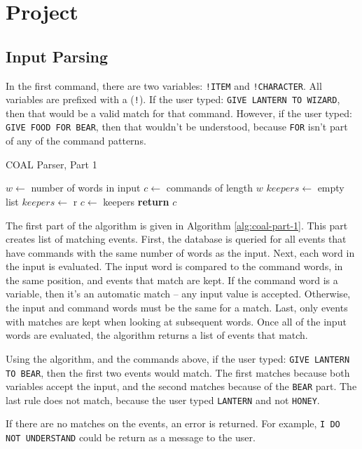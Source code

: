 \documentclass{article}
\newcommand{\enterProblemHeader}[1]{
}
\newcommand{\exitProblemHeader}[1]{
\nobreak\extramarks{#1}{}\nobreak
}
\newcounter{homeworkProblemCounter} %
\newcommand{\homeworkProblemName}{}
\newenvironment{homeworkProblem}[1][Problem \arabic{homeworkProblemCounter}]{ %
\stepcounter{homeworkProblemCounter} %
\renewcommand{\homeworkProblemName}{#1} %
\section{\homeworkProblemName} %
\enterProblemHeader{\homeworkProblemName} %
}{
\exitProblemHeader{\homeworkProblemName} %
}
\newcommand{\homeworkSectionName}{}
\newenvironment{homeworkSection}[1]{ %
\renewcommand{\homeworkSectionName}{#1} %
\subsection{\homeworkSectionName} %
\enterProblemHeader{\homeworkProblemName\ [\homeworkSectionName]} %
}{
\enterProblemHeader{\homeworkProblemName} %
}
\begin{document}
\begin{homeworkProblem}[Project]
\begin{homeworkSection}{Input Parsing}
	In the first command, there are two variables: \texttt{!ITEM} and \texttt{!CHARACTER}. All variables are prefixed with a (\texttt{!}). If the user typed: \texttt{GIVE LANTERN TO WIZARD}, then that would be a valid match for that command. However, if the user typed: \texttt{GIVE FOOD FOR BEAR}, then that wouldn't be understood, because \texttt{FOR} isn't part of any of the command patterns.

	\begin{algorithm}
		\caption{COAL Parser, Part 1}
		\label{alg:coal-part-1}
		\begin{algorithmic}
				\State $w \gets$ number of words in input
				\State $c \gets$ commands of length $w$
					\State $keepers \gets$ empty list
							\State $keepers \gets$ r
						\EndIf
					\EndFor
					\State $c \gets$ keepers
				\EndFor
				\State \textbf{return} $c$
			\EndProcedure
	\end{algorithmic}
	\end{algorithm}

	The first part of the algorithm is given in Algorithm \ref{alg:coal-part-1}. This part creates list of matching events. First, the database is queried for all events that have commands with the same number of words as the input. Next, each word in the input is evaluated. The input word is compared to the command words, in the same position, and events that match are kept. If the command word is a variable, then it's an automatic match -- any input value is accepted. Otherwise, the input and command words must be the same for a match. Last, only events with matches are kept when looking at subsequent words. Once all of the input words are evaluated, the algorithm returns a list of events that match.
	
	Using the algorithm, and the commands above, if the user typed: \texttt{GIVE LANTERN TO BEAR}, then the first two events would match. The first matches because both variables accept the input, and the second matches because of the \texttt{BEAR} part. The last rule does not match, because the user typed \texttt{LANTERN} and not \texttt{HONEY}.

	If there are no matches on the events, an error is returned. For example, \texttt{I DO NOT UNDERSTAND} could be return as a message to the user.


\end{homeworkSection}
\end{homeworkProblem}
\end{document}
